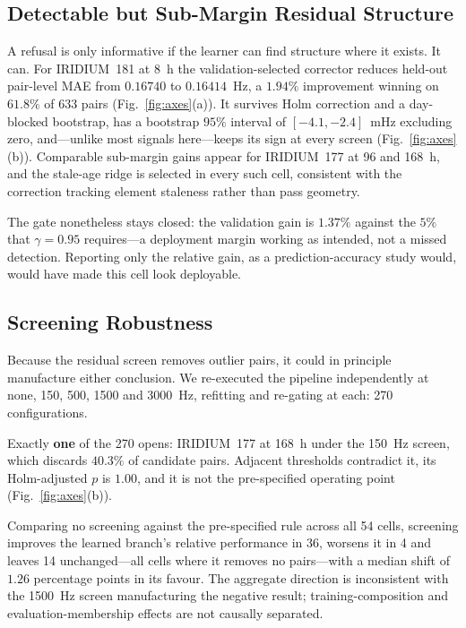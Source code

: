 \documentclass[conference]{IEEEtran}
\begin{document}
\subsection{Detectable but Sub-Margin Residual Structure}
\label{sec:res-detect}
A refusal is only informative if the learner can find structure where it exists.
It can. For IRIDIUM~181 at 8~h the validation-selected corrector reduces held-out
pair-level MAE from $0.16740$ to $0.16414$~Hz, a $1.94\%$ improvement winning on
$61.8\%$ of 633 pairs (Fig.~\ref{fig:axes}(a)). It survives Holm correction and a
day-blocked bootstrap, has a bootstrap $95\%$ interval of $[-4.1,-2.4]$~mHz
excluding zero, and---unlike most signals here---keeps its sign at every screen
(Fig.~\ref{fig:axes}(b)). Comparable sub-margin gains appear for IRIDIUM~177 at 96
and 168~h, and the stale-age ridge is selected in every such cell, consistent with
the correction tracking element staleness rather than pass geometry.

The gate nonetheless stays closed: the validation gain is $1.37\%$ against the
$5\%$ that $\gamma=0.95$ requires---a deployment margin working as intended, not
a missed detection. Reporting only the relative gain, as a prediction-accuracy
study would, would have made this cell look deployable.

\subsection{Screening Robustness}
\label{sec:res-screen}
Because the residual screen removes outlier pairs, it could in principle
manufacture either conclusion. We re-executed the pipeline independently at
none, 150, 500, 1500 and 3000~Hz, refitting and re-gating at each: 270
configurations.

Exactly \textbf{one} of the 270 opens: IRIDIUM~177 at 168~h under the 150~Hz
screen, which discards $40.3\%$ of candidate pairs. Adjacent thresholds contradict
it, its Holm-adjusted $p$ is $1.00$, and it is not the pre-specified operating
point (Fig.~\ref{fig:axes}(b)).

Comparing no screening against the pre-specified rule across all 54 cells,
screening improves the learned branch's relative performance in 36, worsens it in
4 and leaves 14 unchanged---all cells where it removes no pairs---with a median
shift of $1.26$ percentage points in its favour. The aggregate direction is
inconsistent with the 1500~Hz screen manufacturing the negative result;
training-composition and evaluation-membership effects are not causally separated.
\end{document}
